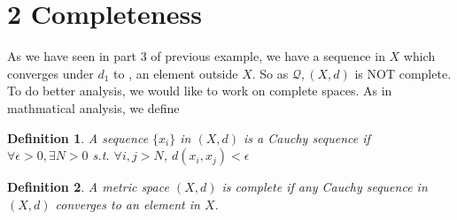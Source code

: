 \documentclass{article}
\newtheorem*{definition}{Definition}
\begin{document}
\section*{2 Completeness}
As we have seen in part 3 of previous example, we have a sequence in $X$ which converges under $d_1$ to
, an element outside $X$. So as $\mathcal{Q}, (X, d)$ is NOT complete. To do better analysis, we would 
like to work on complete spaces. As in mathmatical analysis, we define
\begin{definition}
    A sequence $\{x_i\}$ in $(X, d)$ is a Cauchy sequence if $\forall \epsilon > 0, \exists N > 0$
    s.t. $\forall i, j > N$, $d(x_i, x_j) < \epsilon$
\end{definition}
\begin{definition}
    A metric space $(X, d)$ is complete if any Cauchy sequence in $(X,d)$ converges to an element in $X$.
\end{definition}
\end{document}
